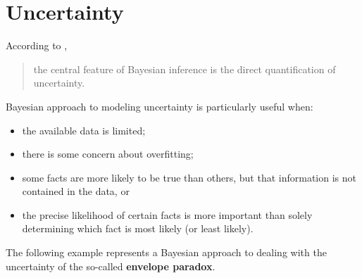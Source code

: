 \section{Uncertainty}
According to \cite{BDA_GCSDVR}, \begin{quote}the central feature of Bayesian inference is the direct quantification of uncertainty.\end{quote}
Bayesian approach to modeling uncertainty is particularly useful when:
\begin{itemize}[noitemsep]
	\item the available data is limited;
	\item there is some concern about overfitting;
	\item some facts are more likely to be true than others, but that information is not contained in the data, or 
	\item the precise likelihood of certain facts is more important than solely determining which fact is most likely (or least likely).
\end{itemize}
The following example represents a Bayesian approach to dealing with the uncertainty of the so-called \textbf{envelope paradox}.
